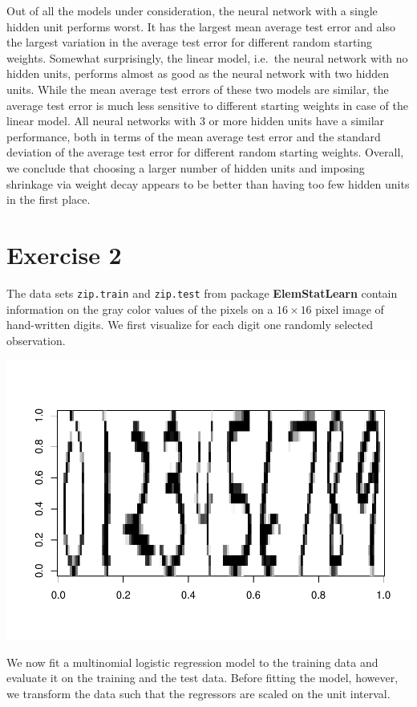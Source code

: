 \documentclass[
]{article}
\begin{document}
Out of all the models under consideration, the neural network with a
single hidden unit performs worst. It has the largest mean average test
error and also the largest variation in the average test error for
different random starting weights. Somewhat surprisingly, the linear
model, i.e.~the neural network with no hidden units, performs almost as
good as the neural network with two hidden units. While the mean average
test errors of these two models are similar, the average test error is
much less sensitive to different starting weights in case of the linear
model. All neural networks with 3 or more hidden units have a similar
performance, both in terms of the mean average test error and the
standard deviation of the average test error for different random
starting weights. Overall, we conclude that choosing a larger number of
hidden units and imposing shrinkage via weight decay appears to be
better than having too few hidden units in the first place.

\newpage

\section{Exercise 2}\label{exercise-2}

The data sets \texttt{zip.train} and \texttt{zip.test} from package
\textbf{ElemStatLearn} contain information on the gray color values of
the pixels on a \(16 \times 16\) pixel image of hand-written digits. We
first visualize for each digit one randomly selected observation.

\includegraphics{A4_files/figure-latex/unnamed-chunk-7-1.pdf}

We now fit a multinomial logistic regression model to the training data
and evaluate it on the training and the test data. Before fitting the
model, however, we transform the data such that the regressors are
scaled on the unit interval.
\end{document}
